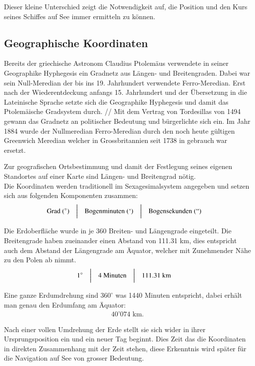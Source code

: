 \begin{refsection}
Dieser kleine Unterschied zeigt die Notwendigkeit auf, die Position und den Kurs seines Schiffes auf See immer ermitteln zu können.


\subsection{Geographische Koordinaten}
Bereits der griechische Astronom Claudius Ptolemäus verwendete in seiner Geographike Hyphegesis ein Gradnetz aus Längen- und Breitengraden. Dabei war sein Null-Meredian der bis ins 19. Jahrhundert verwendete Ferro-Meredian. Erst nach der Wiederentdeckung anfangs 15. Jahrhundert und der Übersetzung in die Lateinische Sprache setzte sich die Geographike Hyphegesis und damit das Ptolemäische Gradsystem durch. //
Mit dem Vertrag von Tordesillas von 1494 gewann das Gradnetz an politischer Bedeutung und bürgerlichte sich ein.
Im Jahr 1884 wurde der Nullmeredian Ferro-Meredian durch den noch heute gültigen Greenwich Meredian welcher in Grossbritannien seit 1738 in gebrauch war ersetzt.

Zur geografischen Ortsbestimmung und damit der Festlegung seines eigenen Standortes auf einer Karte sind Längen- und Breitengrad nötig. \\
Die Koordinaten werden traditionell im Sexagesimalsystem angegeben und setzen sich aus folgenden Komponenten zusammen:
\[
\begin{aligned}
&\text{Grad } (^{\circ})
&
&\text{\bigg \vert}
&
&\text{Bogenminuten } (`)
&
&\text{\bigg \vert}
&
&\text{Bogensekunden } (``)
\end{aligned}
\]

Die Erdoberfläche wurde in je 360 Breiten- und Längengrade eingeteilt. Die Breitengrade haben zueinander einen Abstand von 111.31 km, dies entspricht auch dem Abstand der Längengrade am Äquator, welcher mit Zunehmender Nähe zu den Polen ab nimmt.
\[
\begin{aligned}
&1^{\circ}
&
&\text{\bigg \vert}
&
&4 \text{ Minuten}
&
&\text{\bigg \vert}
&
&111.31\text{ km}
\end{aligned}
\]

Eine ganze Erdumdrehung sind $360 ^{\circ}$ was 1440 Minuten entspricht, dabei erhält man genau den Erdumfang am Äquator:
\begin{align*} 40’074 \text{ km.}\end{align*}

Nach einer vollen Umdrehung der Erde stellt sie sich wider in ihrer Ursprungsposition ein und ein neuer Tag beginnt. Dies Zeit das die Koordinaten in direkten Zusammenhang mit der Zeit stehen, diese Erkenntnis wird später für die Navigation auf See von grosser Bedeutung.



\end{refsection}
